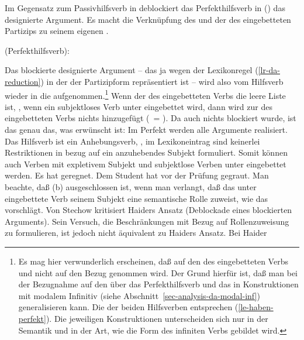 Im Gegensatz zum Passivhilfsverb in 
deblockiert das Perfekthilfsverb in () das designierte Argument.
Es macht die Verknüpfung des \subjwes und der \subcatl des eingebetteten Partizips
zu seinem eigenen \subcatw.

\eas
\mbox{\haben (Perfekthilfsverb):}\\
\label{le-haben-perfekt}
\zs

\noindent
Das blockierte designierte Argument -- das ja wegen der Lexikonregel (\ref{lr-da-reduction}) in der \subjl der Partizipform
repräsentiert ist -- wird also vom Hilfsverb wieder in die \subcatl aufgenommen.\footnote{
  Es mag hier verwunderlich erscheinen, daß auf den \subjw des eingebetteten Verbs und nicht
  auf den \daw Bezug genommen wird. Der Grund hierfür ist, daß man bei der Bezugnahme
  auf den \subjw über das Perfekthilfsverb \haben und das \haben in Konstruktionen mit modalem
  Infinitiv (siehe Abschnitt~\ref{sec-analysis-da-modal-inf}) generalisieren kann. Die \catwe der beiden Hilfsverben entsprechen
  (\ref{le-haben-perfekt}). Die jeweiligen Konstruktionen unterscheiden sich nur in der Semantik und in der Art, wie
  die Form des infiniten Verbs gebildet wird.%
}
Wenn der \subjw des eingebetteten Verbs die leere Liste ist, \dash, wenn ein subjektloses Verb unter \haben 
eingebettet wird, dann wird zur \subcatl des eingebetteten Verbs nichts hinzugefügt (\, = \sliste{}).
Da auch nichts blockiert wurde, ist das genau das, was erwünscht ist:
Im Perfekt werden alle Argumente realisiert. Das Hilfsverb ist
ein Anhebungsverb, \dash, im Lexikoneintrag sind keinerlei Restriktionen in bezug auf ein anzuhebendes
Subjekt formuliert. Somit können auch Verben mit expletivem Subjekt 
und subjektlose Verben unter \haben eingebettet
werden.
\eal
\ex{}
Es hat geregnet.
\ex{}\label{ex-hat-gegraut}
Dem Student hat vor der Prüfung gegraut.
\zl
Man beachte, daß (b) ausgeschlossen ist, wenn man verlangt, daß das
unter \haben eingebettete Verb seinem Subjekt eine semantische Rolle zuweist,
wie das \zb \citet[]{Stechow90a} vorschlägt. Von Stechow kritisiert Haiders Ansatz
(Deblockade eines blockierten Arguments). Sein Versuch, die Beschränkungen mit Bezug
auf Rollenzuweisung zu formulieren, ist jedoch nicht äquivalent zu Haiders Ansatz. Bei Haider
